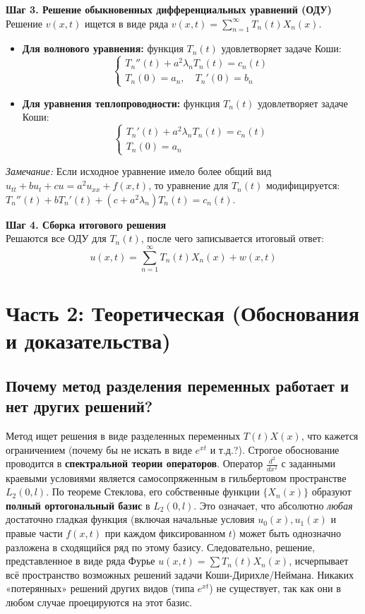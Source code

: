 \documentclass[a4paper,10pt]{article}
\begin{document}
\vspace{0.2cm}
\textbf{Шаг 3. Решение обыкновенных дифференциальных уравнений (ОДУ)} \\
Решение $v(x,t)$ ищется в виде ряда $v(x,t) = \sum_{n=1}^\infty T_n(t) X_n(x)$. 
\begin{itemize}
    \item \textbf{Для волнового уравнения:} функция $T_n(t)$ удовлетворяет задаче Коши:
    \[ \begin{cases} T_n''(t) + a^2 \lambda_n T_n(t) = c_n(t) \\ T_n(0) = a_n, \quad T_n'(0) = b_n \end{cases} \]
    \item \textbf{Для уравнения теплопроводности:} функция $T_n(t)$ удовлетворяет задаче Коши:
    \[ \begin{cases} T_n'(t) + a^2 \lambda_n T_n(t) = c_n(t) \\ T_n(0) = a_n \end{cases} \]
\end{itemize}
\textit{Замечание:} Если исходное уравнение имело более общий вид $u_{tt} + b u_t + c u = a^2 u_{xx} + f(x,t)$, то уравнение для $T_n(t)$ модифицируется: $T_n''(t) + b T_n'(t) + (c + a^2 \lambda_n)T_n(t) = c_n(t)$.

\vspace{0.2cm}
\textbf{Шаг 4. Сборка итогового решения} \\
Решаются все ОДУ для $T_n(t)$, после чего записывается итоговый ответ:
\[ u(x,t) = \sum_{n=1}^\infty T_n(t) X_n(x) + w(x,t) \]

\newpage
\section{Часть 2: Теоретическая (Обоснования и доказательства)}

\subsection*{Почему метод разделения переменных работает и нет других решений?}
Метод ищет решения в виде разделенных переменных $T(t)X(x)$, что кажется ограничением (почему бы не искать в виде $e^{xt}$ и т.д.?). Строгое обоснование проводится в \textbf{спектральной теории операторов}.
Оператор $\frac{d^2}{dx^2}$ с заданными краевыми условиями является самосопряженным в гильбертовом пространстве $L_2(0,l)$. По теореме Стеклова, его собственные функции $\{X_n(x)\}$ образуют \textbf{полный ортогональный базис} в $L_2(0,l)$. 
Это означает, что абсолютно \textit{любая} достаточно гладкая функция (включая начальные условия $u_0(x), u_1(x)$ и правые части $f(x,t)$ при каждом фиксированном $t$) может быть однозначно разложена в сходящийся ряд по этому базису. Следовательно, решение, представленное в виде ряда Фурье $u(x,t) = \sum T_n(t)X_n(x)$, исчерпывает всё пространство возможных решений задачи Коши-Дирихле/Неймана. Никаких «потерянных» решений других видов (типа $e^{xt}$) не существует, так как они в любом случае проецируются на этот базис.
\end{document}
